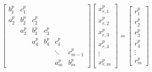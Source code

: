 \begin{align}
& \begin{bmatrix}
b_1^p & c_1^p \\
a_2^p & b_2^p & c_2^p \\
      & a_3^p & b_3^p & c_3^p \\
      &       & a_4^p & b_4^p & c_4^p \\
      &       &       &       &  \ddots & c_{m-1}^p\\
      &       &       &       &     a_{m}^p  & b_{m}^p
\end{bmatrix}
\begin{bmatrix}
x_{r,1}^p \\
x_{r,2}^p \\
x_{r,3}^p \\
x_{r,4}^p \\
\vdots \\
x_{r,m}^p
\end{bmatrix}
=
\begin{bmatrix}
r_1^p \\
r_2^p \\
r_3^p \\
r_4^p \\
\vdots \\
r_m^p
\end{bmatrix} & \label{eqn:primary-system-expanded} \\
\end{align}

